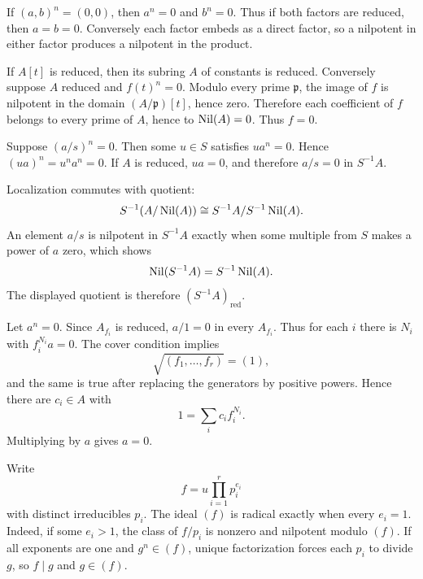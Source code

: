 \begin{solution}
If $(a,b)^n=(0,0)$, then $a^n=0$ and $b^n=0$.  Thus if both factors are reduced, then
$a=b=0$.  Conversely each factor embeds as a direct factor, so a nilpotent in either factor
produces a nilpotent in the product.
\end{solution}

\begin{solution}
If $A[t]$ is reduced, then its subring $A$ of constants is reduced.  Conversely suppose
$A$ reduced and $f(t)^n=0$.  Modulo every prime $\mathfrak p$, the image of $f$ is
nilpotent in the domain $(A/\mathfrak p)[t]$, hence zero.  Therefore each coefficient of
$f$ belongs to every prime of $A$, hence to $\operatorname{Nil}(A)=0$.  Thus $f=0$.
\end{solution}

\begin{solution}
Suppose $(a/s)^n=0$.  Then some $u\in S$ satisfies $ua^n=0$.  Hence
$(ua)^n=u^n a^n=0$.  If $A$ is reduced, $ua=0$, and therefore $a/s=0$ in $S^{-1}A$.
\end{solution}

\begin{solution}
Localization commutes with quotient:
\[
S^{-1}(A/\operatorname{Nil}(A))\cong S^{-1}A/S^{-1}\operatorname{Nil}(A).
\]
An element $a/s$ is nilpotent in $S^{-1}A$ exactly when some multiple from $S$ makes a
power of $a$ zero, which shows
\[
\operatorname{Nil}(S^{-1}A)=S^{-1}\operatorname{Nil}(A).
\]
The displayed quotient is therefore $(S^{-1}A)_{\mathrm{red}}$.
\end{solution}

\begin{solution}
Let $a^n=0$.  Since $A_{f_i}$ is reduced, $a/1=0$ in every $A_{f_i}$.  Thus for each $i$
there is $N_i$ with $f_i^{N_i}a=0$.  The cover condition implies
\[
\sqrt{(f_1,\dots,f_r)}=(1),
\]
and the same is true after replacing the generators by positive powers.  Hence there are
$c_i\in A$ with
\[
1=\sum_i c_i f_i^{N_i}.
\]
Multiplying by $a$ gives $a=0$.
\end{solution}

\begin{solution}
Write
\[
f=u\prod_{i=1}^r p_i^{e_i}
\]
with distinct irreducibles $p_i$.  The ideal $(f)$ is radical exactly when every $e_i=1$.
Indeed, if some $e_i>1$, the class of $f/p_i$ is nonzero and nilpotent modulo $(f)$.
If all exponents are one and $g^n\in(f)$, unique factorization forces each $p_i$ to divide
$g$, so $f\mid g$ and $g\in(f)$.
\end{solution}

